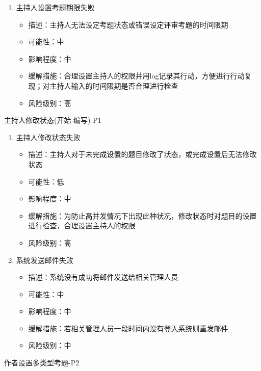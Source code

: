 \documentclass[hyperref, a4paper]{ctexart}
\providecommand{\tightlist}{%
  \setlength{\itemsep}{0pt}\setlength{\parskip}{0pt}}
\begin{document}
\begin{enumerate}
\def\labelenumi{\arabic{enumi}.}
\tightlist
\item
  主持人设置考题期限失败

  \begin{itemize}
  \tightlist
  \item
    描述：主持人无法设定考题状态或错误设定评审考题的时间限期
  \item
    可能性：中
  \item
    影响程度：中
  \item
    缓解措施：合理设置主持人的权限并用log记录其行动，方便进行行动复现；对主持人输入的时间限期是否合理进行检查
  \item
    风险级别：高
  \end{itemize}
\end{enumerate}

主持人修改状态(开始-编写)-P1

\begin{enumerate}
\def\labelenumi{\arabic{enumi}.}
\tightlist
\item
  主持人修改状态失败

  \begin{itemize}
  \tightlist
  \item
    描述：主持人对于未完成设置的题目修改了状态，或完成设置后无法修改状态
  \item
    可能性：低
  \item
    影响程度：中
  \item
    缓解措施：为防止高并发情况下出现此种状况，修改状态时对题目的设置进行检查，合理设置主持人的权限
  \item
    风险级别：高
  \end{itemize}
\item
  系统发送邮件失败

  \begin{itemize}
  \tightlist
  \item
    描述：系统没有成功将邮件发送给相关管理人员
  \item
    可能性：中
  \item
    影响程度：中
  \item
    缓解措施：若相关管理人员一段时间内没有登入系统则重发邮件
  \item
    风险级别：中
  \end{itemize}
\end{enumerate}

作者设置多类型考题-P2
\end{document}
